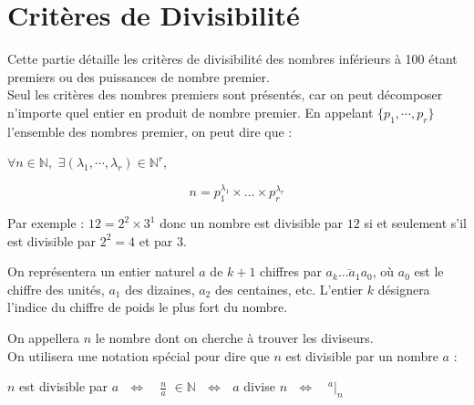 \documentclass[a4paper]{article}
\begin{document}
\vfill

\pagebreak






\section{Critères de Divisibilité}

	Cette partie détaille les critères de divisibilité des nombres inférieurs à 100 étant premiers ou des puissances de nombre premier.\\

	Seul les critères des nombres premiers sont présentés, car on peut décomposer n'importe quel entier en produit de nombre premier. En appelant $\{p_1,\cdots, p_r\}$ l'ensemble des nombres premier, on peut dire que :
	
	\begin{center}
	$ \forall n \in \mathbb{N},$  $\exists (\lambda_1, \cdots , \lambda_r) \in \mathbb{N}^r, $
	\end{center}
	{\Large $$n = p_{1}^{\lambda_1} \times \dots \times p_{r}^{\lambda_r}$$} 
	
	Par exemple : $12 = 2^2 \times 3^1$ donc un nombre est divisible par $12$ si et seulement s'il est divisible par $2^2=4$ et par $3$.\\

	\par On représentera un entier naturel $a$ de $k + 1$ chiffres par $\overline{a_k \ldots a_1 a_0}$, où $a_0$ est le chiffre des unités, $a_1$ des dizaines, $a_2$ des centaines, etc. L'entier $k$ désignera l'indice du chiffre de poids le plus fort du nombre.\\

	\par On appellera $n$ le nombre dont on cherche à trouver les diviseurs.\\
	
	On utilisera une notation spécial pour dire que $n$ est divisible par un nombre $a$ :

	\begin{center}
	$n$ est divisible par $a ~~~ \Longleftrightarrow ~~~ $ {\Large $\frac{n}{a}$} $\in \mathbb{N} ~~~ \Longleftrightarrow ~~~ a$ divise $n ~~~ \Longleftrightarrow ~~~ $ {\LARGE $^a|_n$}
	\end{center}

	\bigskip \bigskip \bigskip \bigskip 
	
\end{document}
